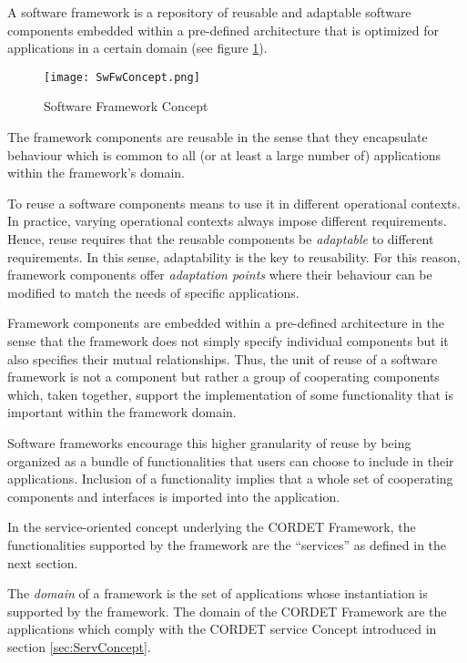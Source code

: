 A software framework is a repository of reusable and adaptable software components embedded within a pre-defined architecture that is optimized for applications in a certain domain (see figure \ref{fig:SwFwConcept}).

\begin{figure}[ht]
 \centering
 \texttt{[image: SwFwConcept.png]}
 \caption{Software Framework Concept}
 \label{fig:SwFwConcept}
\end{figure}

The framework components are reusable in the sense that they encapsulate behaviour which is common to all (or at least a large number of) applications within the framework's domain.

To reuse a software components means to use it in different operational contexts. 
In practice, varying operational contexts always impose different requirements. 
Hence, reuse requires that the reusable components be \textit{adaptable} to different requirements. 
In this sense, adaptability is the key to reusability. 
For this reason, framework components offer \textit{adaptation points} where their behaviour can be modified to match the needs of specific applications.

Framework components are embedded within a pre-defined architecture in the sense that the framework does not simply specify individual components but it also specifies their mutual relationships. 
Thus, the unit of reuse of a software framework is not a component but rather a group of cooperating components which, taken together, support the implementation of some functionality that is important within the framework domain. 

Software frameworks encourage this higher granularity of reuse by being organized as a bundle of functionalities that users can choose to include in their applications. 
Inclusion of a functionality implies that a whole set of cooperating components and interfaces is imported into the application. 

In the service-oriented concept underlying the CORDET Framework, the functionalities supported by the framework are the “services” as defined in the next section.

The \textit{domain} of a framework is the set of applications whose instantiation is supported by the framework. The domain of the CORDET Framework are the applications which comply with the CORDET service Concept introduced in section \ref{sec:ServConcept}.

